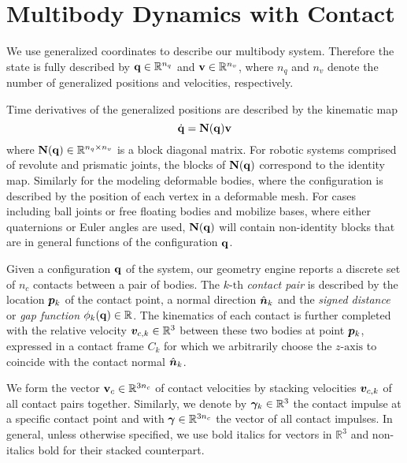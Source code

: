 \section{Multibody Dynamics with Contact}
\label{sec:multibody_dynamics_with_contact}

We use generalized coordinates to describe our multibody system. Therefore the
state is fully described by ${\mathbf{q}}\in\mathbb{R}^{n_q}$ and
${\mathbf{v}}\in\mathbb{R}^{n_v}$, where $n_q$ and $n_v$ denote the number of
generalized positions and velocities, respectively.

Time derivatives of the generalized positions are described by the kinematic map
\begin{equation}
	\dot{\mf{q}} = \mf{N}(\mf{q})\mf{v}
	\label{eq:kinematic_map}
\end{equation}
where ${\mathbf{N}}({\mathbf{q}})\in\mathbb{R}^{n_q\times n_v}$ is a block diagonal matrix.
For robotic systems comprised of revolute and prismatic joints, the blocks of
${\mathbf{N}}({\mathbf{q}})$ correspond to the identity map. Similarly for the modeling
deformable bodies, where the configuration is described by the position of each
vertex in a deformable mesh. For cases including ball joints or free floating
bodies and mobilize bases, where either quaternions or Euler angles are used,
${\mathbf{N}}({\mathbf{q}})$ will contain non-identity blocks that are in general functions
of the configuration ${\mathbf{q}}$.

Given a configuration ${\mathbf{q}}$ of the system, our geometry engine reports a
discrete set of $n_c$ contacts between a pair of bodies. The $k\text{-th}$
\emph{contact pair} is described by the location ${\bm{p}}_k$ of the contact
point, a normal direction $\hat{{\bm{n}}}_k$ and the \emph{signed distance} or
\emph{gap function} $\phi_k({\mathbf{q}})\in\mathbb{R}$. The kinematics of each
contact is further completed with the relative velocity
${\bm{v}}_{c,k}\in\mathbb{R}^3$ between these two bodies at point ${\bm{p}}_k$,
expressed in a contact frame $C_k$ for which we arbitrarily choose the
$z\text{-axis}$ to coincide with the contact normal $\hat{{\bm{n}}}_k$.

We form the vector ${\mathbf{v}}_{c}\in\mathbb{R}^{3n_c}$ of contact velocities by
stacking velocities ${\bm{v}}_{c,k}$ of all contact pairs together. Similarly, we
denote by ${\bm\gamma}_k\in\mathbb{R}^3$ the contact impulse at a specific contact
point and with ${\bm\gamma}\in\mathbb{R}^{3n_c}$ the vector of all contact impulses.
In general, unless otherwise specified, we use bold italics for vectors in
$\mathbb{R}^3$ and non-italics bold for their stacked counterpart.

